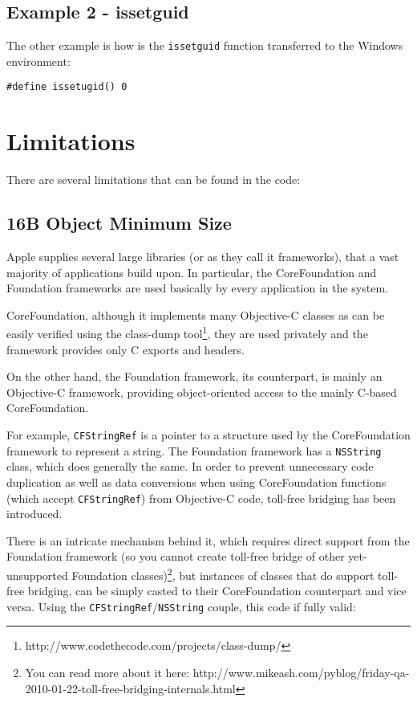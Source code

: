 \subsection{Example 2 - issetguid}
The other example is how is the \verb=issetguid= function transferred to the Windows environment:

\begin{verbatim}
#define issetugid() 0
\end{verbatim}

\section{Limitations}
There are several limitations that can be found in the code:

\subsection{16B Object Minimum Size}
Apple supplies several large libraries (or as they call it frameworks), that a vast majority of applications build upon. In particular, the CoreFoundation and Foundation frameworks are used basically by every application in the system.

CoreFoundation, although it implements many Objective-C classes as can be easily verified using the class-dump tool\footnote{http://www.codethecode.com/projects/class-dump/}, they are used privately and the framework provides only C exports and headers.

On the other hand, the Foundation framework, its counterpart, is mainly an Objective-C framework, providing object-oriented access to the mainly C-based CoreFoundation.

For example, \verb=CFStringRef= is a pointer to a structure used by the CoreFoundation framework to represent a string. The Foundation framework has a \verb=NSString= class, which does generally the same. In order to prevent unnecessary code duplication as well as data conversions when using CoreFoundation functions (which accept \verb=CFStringRef=) from Objective-C code, toll-free bridging has been introduced.

There is an intricate mechanism behind it, which requires direct support from the Foundation framework (so you cannot create toll-free bridge of other yet-unsupported Foundation classes)\footnote{You can read more about it here: http://www.mikeash.com/pyblog/friday-qa-2010-01-22-toll-free-bridging-internals.html}, but instances of classes that do support toll-free bridging, can be simply casted to their CoreFoundation counterpart and vice versa. Using the \verb=CFStringRef=/\verb=NSString= couple, this code if fully valid:

